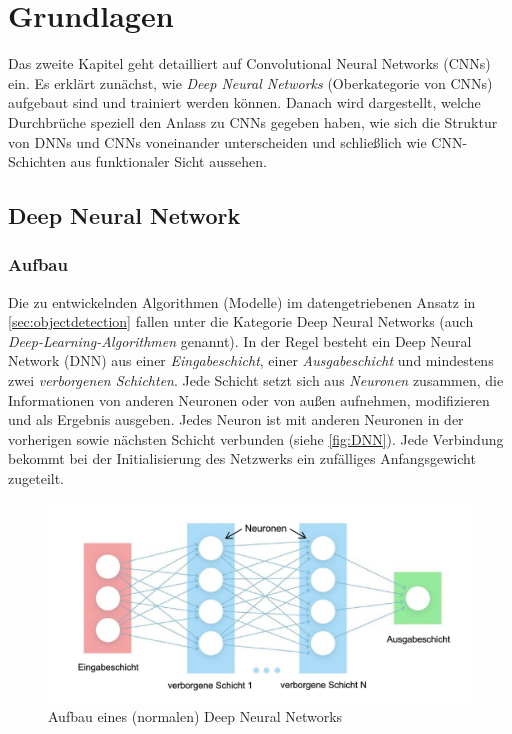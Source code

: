 \chapter{Grundlagen} \label{chap:grundlagen}

Das zweite Kapitel geht detailliert auf Convolutional Neural Networks (CNNs) ein. Es erklärt zunächst, wie \emph{Deep Neural Networks} (Oberkategorie von CNNs) aufgebaut sind und trainiert werden können. Danach wird dargestellt, welche Durchbrüche speziell den Anlass zu CNNs gegeben haben, wie sich die Struktur von DNNs und CNNs voneinander unterscheiden und schließlich wie CNN-Schichten aus funktionaler Sicht aussehen.

\section{Deep Neural Network}

\subsection{Aufbau}

Die zu entwickelnden Algorithmen (Modelle) im datengetriebenen Ansatz in \autoref{sec:objectdetection} fallen unter die Kategorie Deep Neural Networks (auch \emph{Deep-Learning-Algorithmen} genannt). In der Regel besteht ein Deep Neural Network (DNN) aus einer \emph{Eingabeschicht}, einer \emph{Ausgabeschicht} und mindestens zwei \emph{verborgenen Schichten}. Jede Schicht setzt sich aus \emph{Neuronen} zusammen, die Informationen von anderen Neuronen oder von außen aufnehmen, modifizieren und als Ergebnis ausgeben. Jedes Neuron ist mit anderen Neuronen in der vorherigen sowie nächsten Schicht verbunden (siehe \autoref{fig:DNN}). Jede Verbindung bekommt bei der Initialisierung des Netzwerks ein zufälliges Anfangsgewicht zugeteilt.

\begin{figure}[!hb]
	\centering
	\includegraphics[width=\linewidth]{images/DNN}
	\caption{Aufbau eines (normalen) Deep Neural Networks \protect\cite{AufbauDNN}}
	\label{fig:DNN}
\end{figure}

